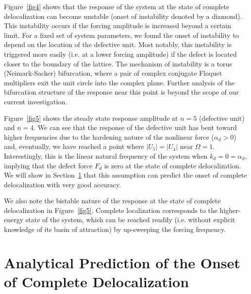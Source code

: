 \documentclass[aps,pre,twocolumn,groupedaddress]{revtex4-1}
\begin{document}
Figure~\ref{fig4} shows that the response of the system at the state of complete delocalization can become unstable (onset of instability denoted by a diamond). This instability occurs if the forcing amplitude is increased beyond a certain limit. 
For a fixed set of system parameters, we found the onset of instability to depend on the location of the defective unit. Most notably, this instability is triggered more easily (i.e. at a lower forcing amplitude) if the defect is located closer to the boundary of the lattice. 
The mechanism of instability is a torus (Neimark-Sacker) bifurcation, where a pair of complex conjugate Floquet multipliers exit the unit circle into the complex plane. Further analysis of the bifurcation structure of the response near this point is beyond the scope of our current investigation. 



Figure~\ref{fig5} shows the steady state response amplitude at $n=5$  (defective unit) and $n=4$. We can see that the response of the defective unit has bent toward higher frequencies due to the hardening nature of the nonlinear force ($\alpha_d>0$) and, eventually, we have reached a point where $|U_5|=|U_4|$ near $\Omega = 1$. Interestingly, this is the linear natural frequency of the system when $k_d=0=\alpha_d$, implying that the defect force $F_d$ is zero at the state of complete delocalization. 
We will show in Section~\ref{sec:analysis} that this assumption can predict the onset of complete delocalization with very good accuracy. 

We also note the bistable nature of the response at the state of complete delocalization in Figure~\ref{fig5}. Complete localization corresponds to the higher-energy state of the system, which can be reached readily (i.e. without explicit knowledge of its basin of attraction) by up-sweeping the forcing frequency. 









\section{Analytical Prediction of the Onset of Complete Delocalization}
\label{sec:analysis}
\end{document}
